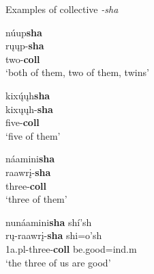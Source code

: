 \begin{exe}
\item\label{ExSHA} Examples of collective \textit{-sha}

	\begin{xlist}
	
	\item \glll núup\textbf{sha}\\
	rųųp-\textbf{sha}\\
	\textnormal{two}-\textbf{coll}\\
	\glt `both of them, two of them, twins' \citep[481]{hollow1970}
	
	\item \glll kixų́ųh\textbf{sha}\\
	kixųųh-\textbf{sha}\\
	\textnormal{five}-\textbf{coll}\\
	\glt `five of them' \citep[481]{hollow1970}
	
	\item \glll náamini\textbf{sha}\\
	raawrį-\textbf{sha}\\
	\textnormal{three}-\textbf{coll}\\
	\glt `three of them' \citep[481]{hollow1970}
	
	\item \glll nunáamini\textbf{sha} shí'sh\\
	rų-raawrį-\textbf{sha} shi=o'sh\\
	1a.pl-\textnormal{three}-\textbf{coll} \textnormal{be.good}=ind.m\\
	\glt `the three of us are good' \citep[481]{hollow1970}
	
	\end{xlist}

\end{exe}


